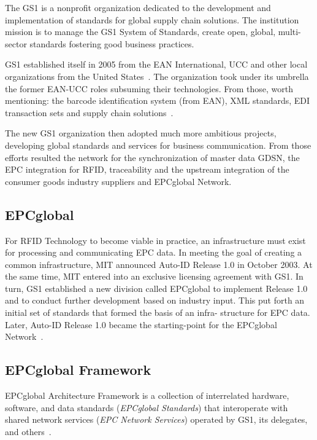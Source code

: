 The GS1 is a nonprofit organization dedicated to the development and implementation of standards for global \gls{supply chain} solutions. 
The institution mission is to manage the GS1 System of Standards, create open, global, multi-sector standards fostering good business practices.

GS1 established itself in 2005 from the \gls{EAN} International, \gls{UCC} and other local organizations from the United States~\cite{PublicationLEBENSMITTELZEITUNGa}.
The organization took under its umbrella the former EAN-UCC roles subsuming their technologies. From those, worth mentioning: the barcode identification system (from \gls{EAN}), \gls{XML} standards, \gls{EDI} transaction sets and \gls{supply chain} solutions~\cite[p.~212]{lahiriRFIDSourcebook2005}.

The new GS1 organization then adopted much more ambitious projects, developing global standards and services for business communication.
From those efforts resulted the network for the synchronization of master data \gls{GDSN}, the \gls{EPC} integration for \gls{RFID}, traceability and the upstream integration of the consumer goods industry suppliers and EPCglobal Network.

\subsection{EPCglobal}

For RFID Technology to become viable in practice, an infrastructure must exist for processing and communicating EPC data. In meeting the goal of creating a common infrastructure, MIT announced Auto-ID Release 1.0 in October 2003. At the same time, MIT entered into an exclusive licensing agreement with GS1.
In turn, GS1 established a new division called EPCglobal to implement Release 1.0 and to conduct further development based on industry input. This put forth an initial set of standards that formed the basis of an infra- structure for EPC data. Later, Auto-ID Release 1.0 became the starting-point for the EPCglobal Network~\cite[p. 50]{GlobalRFIDValue}. 


\subsection{EPCglobal Framework}

EPCglobal Architecture Framework is a collection of interrelated hardware, software, and data standards (\emph{EPCglobal Standards}) that interoperate with shared network services (\emph{EPC Network Services}) operated by GS1, its delegates, and others~\cite{Architecture6framework20140414Pdf}.

